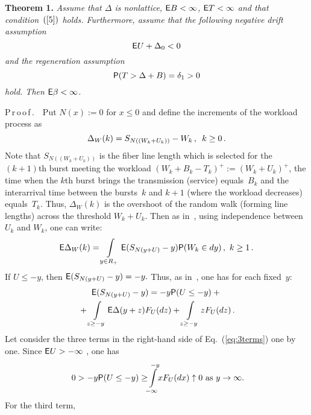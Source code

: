 \begin{multicols}{2}
\medskip

\noindent
\textbf{Theorem 1.} \textit{Assume that $\Delta$ is nonlattice, ${\sf E} B <
\infty$, ${\sf E} T < \infty$ and  that condition~$(\ref{5})$  holds. 
Furthermore, assume  that the following negative drift assumption
\begin{equation}
\label{eq:condition2} 
{\sf E}U+\Delta_0  < 0
\end{equation}
and the regeneration assumption
\begin{equation}
\label{eq:condition3} 
{\sf P}(T > \Delta + B ) = \delta_1 > 0
\end{equation}
 hold. Then  ${\sf E}
\beta<\infty$.}

\medskip

P\,r\,o\,o\,f\,.\ \  Put $N(x):=0$ for $x\le 0$ and define the increments of
the workload process  as
\begin{equation*}
\Delta_{W}(k) = S_{N((W_k+U_k))}-W_k\,, \enskip k\ge 0\,.
\end{equation*}
Note  that $S_{N((W_k+U_k))}$ is the fiber line length which
is selected for the $(k+1)$th burst meeting the workload
$(W_k+B_k-T_k)^+:=(W_k+U_k)^+$, the time when  the $k$th burst brings the
transmission (service) equals~$B_k$ and the interarrival time
between the bursts~$k$ and $k+1$ (where the workload decreases)
equals~$T_k$. Thus, $\Delta_{W}(k)$ is the overshoot of the random
walk (forming line lengths) across the threshold $W_k+U_k$. Then
 as in~\cite{optical1}, using
independence between $U_{k}$ and $W_{k}$, one can write:
\begin{equation*}
{\sf E}\Delta_{W}(k)=
 \int\limits_{y\in R_{+}} {\sf E}(S_{N(y+U)}-y){\sf P}(W_{k} \in
 dy)\,,\ k\ge1\,.
\end{equation*}
If $U\le-y$, then ${\sf E}(S_{N(y+U)}-y)=-y.$ Thus, as in~\cite{optical1}, one 
has for each  fixed~$y$:
\begin{multline}
{\sf E}(S_{N(y+U)}-y)= - y{\sf P}(U\le-y) +{}\\
{}+\int\limits_{z\ge-y} {\sf E} \Delta 
(y+z)F_{U}(dz) +\int\limits_{z\ge-y}zF_{U}(dz)\,. 
\label{eq:3terms}
\end{multline}
Let consider the three terms in the right-hand side of Eq.~(\ref{eq:3terms}) one by 
one. Since ${\sf E} U>-\infty$ , one has
\begin{equation}
0>-y{\sf P}(U\le-y) \ge\!\!
\int\limits_{-\infty}^{-y}\! \! xF_{U}(dx)\uparrow0\,\,\mbox{as}\,\,
y\to\infty.\!\!
\label{eq:PUtozero}
\end{equation}
For the third term, %

\end{multicols}
